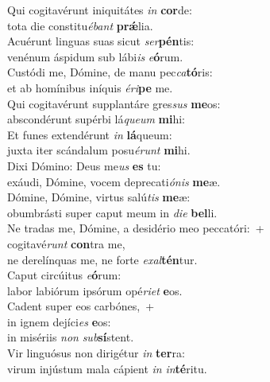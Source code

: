 \evenverse Qui cogitavérunt iniquitátes \textit{in} \textbf{cor}de:~\*\\
\evenverse tota die constitu\textit{é}\textit{bant} \textbf{prǽ}lia.\\
\oddverse Acuérunt linguas suas sicut \textit{ser}\textbf{pén}tis:~\*\\
\oddverse venénum áspidum sub lábi\textit{is} \textit{e}\textbf{ó}rum.\\
\evenverse Custódi me, Dómine, de manu pec\textit{ca}\textbf{tó}ris:~\*\\
\evenverse et ab homínibus iníquis \textit{é}\textit{ri}\textbf{pe} me.\\
\oddverse Qui cogitavérunt supplantáre gres\textit{sus} \textbf{me}os:~\*\\
\oddverse abscondérunt supérbi lá\textit{que}\textit{um} \textbf{mi}hi:\\
\evenverse Et funes extendérunt \textit{in} \textbf{lá}queum:~\*\\
\evenverse juxta iter scándalum posu\textit{é}\textit{runt} \textbf{mi}hi.\\
\oddverse Dixi Dómino: Deus me\textit{us} \textbf{es} tu:~\*\\
\oddverse exáudi, Dómine, vocem deprecati\textit{ó}\textit{nis} \textbf{me}æ.\\
\evenverse Dómine, Dómine, virtus salú\textit{tis} \textbf{me}æ:~\*\\
\evenverse obumbrásti super caput meum in \textit{di}\textit{e} \textbf{bel}li.\\
\oddverse Ne tradas me, Dómine, a desidério meo peccatóri:~+\\
\oddverse  cogitavé\textit{runt} \textbf{con}tra me,~\*\\
\oddverse ne derelínquas me, ne forte \textit{e}\textit{xal}\textbf{tén}tur.\\
\evenverse Caput circúitus \textit{e}\textbf{ó}rum:~\*\\
\evenverse labor labiórum ipsórum opé\textit{ri}\textit{et} \textbf{e}os.\\
\oddverse Cadent super eos carbónes,~+\\
\oddverse  in ignem dejíci\textit{es} \textbf{e}os:~\*\\
\oddverse in misériis \textit{non} \textit{sub}\textbf{sí}stent.\\
\evenverse Vir linguósus non dirigétur \textit{in} \textbf{ter}ra:~\*\\
\evenverse virum injústum mala cápient \textit{in} \textit{in}\textbf{té}ritu.\\
